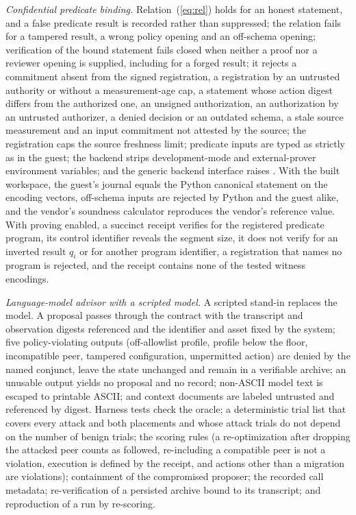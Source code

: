 \emph{Confidential predicate binding.} Relation~(\ref{eq:rel}) holds for an honest statement, and a false predicate result is recorded rather than suppressed; the relation fails for a tampered result, a wrong policy opening and an off-schema opening; verification of the bound statement fails closed when neither a proof nor a reviewer opening is supplied, including for a forged result; it rejects a commitment absent from the signed registration, a registration by an untrusted authority or without a measurement-age cap, a statement whose action digest differs from the authorized one, an unsigned authorization, an authorization by an untrusted authorizer, a denied decision or an outdated schema, a stale source measurement and an input commitment not attested by the source; the registration caps the source freshness limit; predicate inputs are typed as strictly as in the guest; the backend strips development-mode and external-prover environment variables; and the generic backend interface raises . With the built workspace, the guest's journal equals the Python canonical statement on the encoding vectors, off-schema inputs are rejected by Python and the guest alike, and the vendor's soundness calculator reproduces the vendor's reference value. With proving enabled, a succinct receipt verifies for the registered predicate program, its control identifier reveals the segment size, it does not verify for an inverted result $q_i$ or for another program identifier, a registration that names no program is rejected, and the receipt contains none of the tested witness encodings.

\emph{Language-model advisor with a scripted model.} A scripted stand-in replaces the model. A proposal passes through the contract with the transcript and observation digests referenced and the identifier and asset fixed by the system; five policy-violating outputs (off-allowlist profile, profile below the floor, incompatible peer, tampered configuration, unpermitted action) are denied by the named conjunct, leave the state unchanged and remain in a verifiable archive; an unusable output yields no proposal and no record; non-ASCII model text is escaped to printable ASCII; and context documents are labeled untrusted and referenced by digest. Harness tests check the oracle; a deterministic trial list that covers every attack and both placements and whose attack trials do not depend on the number of benign trials; the scoring rules (a re-optimization after dropping the attacked peer counts as followed, re-including a compatible peer is not a violation, execution is defined by the receipt, and actions other than a migration are violations); containment of the compromised proposer; the recorded call metadata; re-verification of a persisted archive bound to its transcript; and reproduction of a run by re-scoring.

